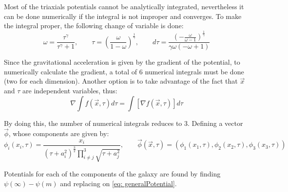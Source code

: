 	Most of the triaxials potentials cannot be analytically integrated, nevertheless it can be done numerically if the integral is not improper and converges. To make the integral proper, the following change of variable is done:
	\begin{equation}
		\omega = \dfrac{\tau^\gamma}{\tau^\gamma + 1}, \qquad \tau = \left(\frac{\omega}{1-\omega}\right)^{\frac{1}{\gamma}}, \qquad d\tau = \dfrac{\left(- \frac{\omega}{\omega - 1}\right)^{\frac{1}{\gamma}}}{\gamma \omega \left(- \omega + 1\right)}
	\end{equation} 
	
	Since the gravitational acceleration is given by the gradient of the potential, to numerically calculate the gradient, a total of 6 numerical integrals must be done (two for each dimension). Another option is to take advantage of the fact that $\vec{x}$ and $\tau$ are independent variables, thus:
	\begin{equation}
		\nabla \int f(\vec{x}, \tau)d\tau = \int [\nabla f(\vec{x}, \tau)] d\tau
	\end{equation}
	
	By doing this, the number of numerical integrals reduces to 3. Defining a vector $\vec{\phi}$, whose components are given by:
	\begin{equation}
		\phi_i(x_i, \tau) = \dfrac{x_i}{\left(\tau + a_i^2\right)^{\frac{3}{2}} \prod\limits_{i \neq j}^3\sqrt{\tau + a_j^2}}, \qquad \vec{\phi}(\vec{x}, \tau) = (\phi_1(x_1, \tau), \phi_2(x_2, \tau), \phi_3(x_3, \tau))
	\end{equation}
	
	Potentials for each of the components of the galaxy are found by finding $\psi(\infty) - \psi(m)$ and replacing on \autoref{eq: generalPotential}.
	
